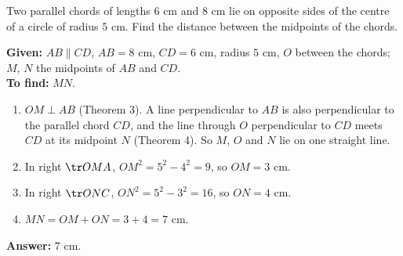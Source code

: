 \begin{example}
Two parallel chords of lengths $6$ cm and $8$ cm lie on opposite sides of the centre of a circle of radius $5$ cm. Find the distance between the midpoints of the chords.
\end{example}


\textbf{Given:} $AB\parallel CD$, $AB=8$ cm, $CD=6$ cm, radius $5$ cm, $O$ between the chords; $M$, $N$ the midpoints of $AB$ and $CD$.\\
\textbf{To find:} $MN$.
\begin{enumerate}[leftmargin=1.8em,itemsep=1pt]
  \item $OM\perp AB$ (Theorem 3). A line perpendicular to $AB$ is also perpendicular to the parallel chord $CD$, and the line through $O$ perpendicular to $CD$ meets $CD$ at its midpoint $N$ (Theorem 4). So $M$, $O$ and $N$ lie on one straight line.
  \item In right $\tr OMA$, $OM^2=5^2-4^2=9$, so $OM=3$ cm.
  \item In right $\tr ONC$, $ON^2=5^2-3^2=16$, so $ON=4$ cm.
  \item $MN=OM+ON=3+4=7$ cm.
\end{enumerate}
\textbf{Answer:} $7$ cm.


